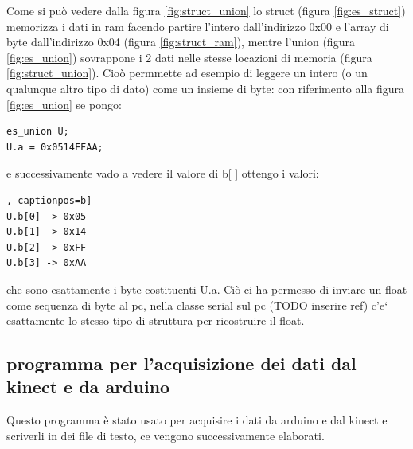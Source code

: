 \documentclass[10pt,a4paper]{article}
\begin{document}
Come si pu\`o vedere dalla figura \ref{fig:struct_union} lo struct (figura \ref{fig:es_struct}) memorizza i dati in ram facendo partire l'intero dall'indirizzo 0x00 e l'array di byte dall'indirizzo 0x04 (figura \ref{fig:struct_ram}), mentre l'union (figura \ref{fig:es_union}) sovrappone i 2 dati nelle stesse locazioni di memoria (figura \ref{fig:struct_union}).
Cio\`o permmette ad esempio di leggere un intero (o un qualunque altro tipo di dato) come un insieme di byte: con riferimento alla figura \ref{fig:es_union} se pongo:
\begin{lstlisting}[style=myArduino, caption=classe "serial", captionpos=b]
es_union U;
U.a = 0x0514FFAA;
\end{lstlisting}
e successivamente vado a vedere il valore di b[ ] ottengo i valori:
\begin{lstlisting}[style=myoutput, caption=print dei valori di b[ ], captionpos=b]
U.b[0] -> 0x05
U.b[1] -> 0x14
U.b[2] -> 0xFF
U.b[3] -> 0xAA
\end{lstlisting}
che sono esattamente i byte costituenti U.a. Ci\`o ci ha permesso di inviare un float come sequenza di byte al pc, nella classe serial sul pc (TODO inserire ref) c'e` esattamente lo stesso tipo di struttura per ricostruire il float. 

\subsection{programma per l'acquisizione dei dati dal kinect e da arduino}
Questo programma \`e stato usato per acquisire i dati da arduino e dal kinect e scriverli in dei file di testo, ce vengono successivamente elaborati. 
%
%
\end{document}
